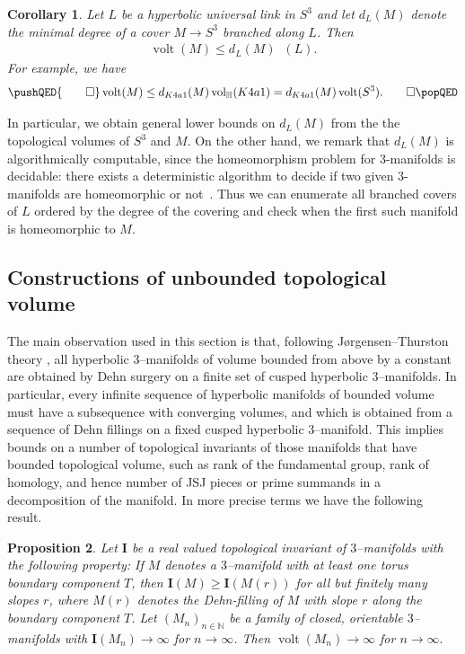 \documentclass[a4paper]{gtart}
\newtheorem{proposition}{Proposition}[section]
\newtheorem{corollary}[proposition]{Corollary}
\theoremstyle{definition}
\theoremstyle{remark}
\numberwithin{equation}{section}
\newcommand{\N}{\mathbb{N}}
\DeclareMathOperator{\volt}{volt}
\DeclareMathOperator{\volh}{vol_{\mathbb{H}}}
\begin{document}
\begin{corollary}
Let $L$ be a hyperbolic universal link in $S^3$ and let $d_L(M)$ denote the minimal degree of a cover $M\rightarrow S^3$ branched along $L$. Then
\begin{align*}
    \volt(M)\leq d_L(M) \volh(L).
\end{align*}
For example, we have
\[
\pushQED{\qed} 
 \volt(M)\leq d_{K4a1}(M) \volh(K4a1)=d_{K4a1}(M)\volt(S^3).\qedhere
\popQED
\]  
\end{corollary}

In particular, we obtain general lower bounds on $d_L(M)$ from the the topological volumes of $S^3$ and $M$. On the other hand, we remark that $d_L(M)$ is algorithmically computable, since the homeomorphism problem for $3$-manifolds is decidable: there exists a deterministic algorithm to decide if two given $3$-manifolds are homeomorphic or not~\cite{Kuperberg}. Thus we can enumerate all branched covers of $L$ ordered by the degree of the covering and check when the first such manifold is homeomorphic to $M$.

\subsection{Constructions of unbounded topological volume}
\label{ssec:unbounded}

The main observation used in this section is that, following J\o{}rgensen--Thurston theory \cite{thurston-notes,Gro81, Mai10}, all hyperbolic 3--manifolds of volume bounded from above by a constant are obtained by Dehn surgery on a finite set of cusped hyperbolic 3--manifolds. In particular, every infinite sequence of hyperbolic manifolds of bounded volume must have a subsequence with converging volumes, and which is obtained from a sequence of Dehn fillings on a fixed cusped hyperbolic $3$--manifold. This implies bounds on a number of topological invariants of those manifolds that have bounded topological volume, such as rank of the fundamental group, rank of homology, and hence number of JSJ pieces or prime summands in a decomposition of the manifold. In more precise terms we have the following result.

\begin{proposition}\label{prop:increasing-complexity}
	Let $\mathbf{I}$ be a real valued topological invariant of $3$--manifolds with the following property: If $M$ denotes a $3$--manifold with at least one torus boundary component $T$, then $\mathbf{I}(M)\geq \mathbf{I}(M(r))$ for all but finitely many slopes $r$, where $M(r)$ denotes the Dehn-filling of $M$ with slope $r$ along the boundary component $T$.
	Let $(M_n)_{n\in\N}$ be a family of closed, orientable $3$--manifolds with $\mathbf{I}(M_n) \rightarrow \infty$ for $n\rightarrow  \infty$. Then $\volt(M_n)\rightarrow \infty$ for $n\rightarrow \infty.$
\end{proposition}
\end{document}
